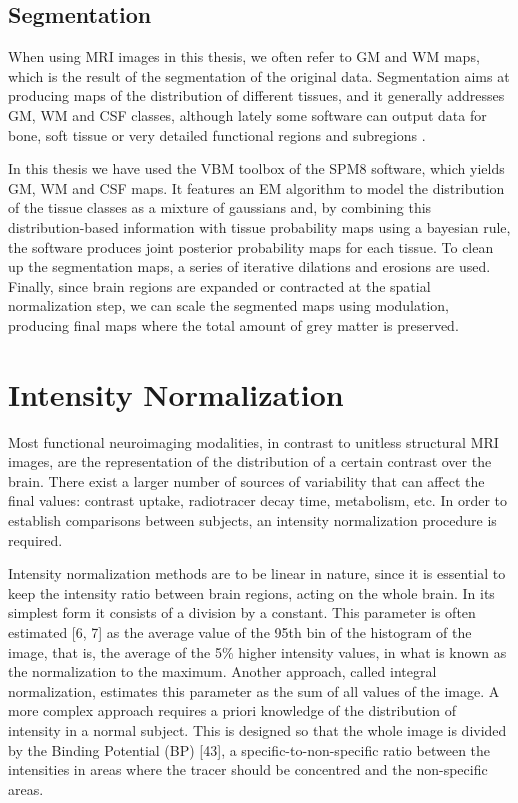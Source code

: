 \subsection{Segmentation}
When using \ac{MRI} images in this thesis, we often refer to \acf{GM} and \acf{WM} maps, which is the result of the segmentation of the original data. Segmentation aims at producing maps of the distribution of different tissues, and it generally addresses \ac{GM}, \ac{WM} and \ac{CSF} classes, although lately some software can output data for bone, soft tissue or very detailed functional regions and subregions \cite{Fischl2002}. 

In this thesis we have used the \ac{VBM} toolbox of the \ac{SPM8} software, which yields \ac{GM}, \ac{WM} and \ac{CSF} maps. It features an \ac{EM} algorithm to model the distribution of the tissue classes as a mixture of gaussians and, by combining this distribution-based information with tissue probability maps using a bayesian rule, the software produces joint posterior probability maps for each tissue. To clean up the segmentation maps, a series of iterative dilations and erosions are used. Finally, since brain regions are expanded or contracted at the spatial normalization step, we can scale the segmented maps using modulation, producing final maps where the total amount of grey matter is preserved. 

\section{Intensity Normalization}
Most functional neuroimaging modalities, in contrast to unitless structural MRI images, are the representation of the distribution of a certain contrast over the brain. There exist a larger number of sources of variability that can affect the final values: contrast uptake, radiotracer decay time, metabolism, etc.  In order to establish comparisons between subjects, an intensity normalization procedure is required. 

Intensity normalization methods are to be linear in nature, since it is essential to keep the intensity ratio between brain regions, acting on the whole brain. In its simplest form it consists of a division by a constant. This parameter is often estimated [6, 7] as the average value of the 95th bin of the histogram of the image, that is, the average of the 5\% higher intensity values, in what is known as the normalization to the maximum. Another approach, called integral normalization, estimates this parameter as the sum of all values of the image. A more complex approach requires a priori knowledge of the distribution of intensity in a normal subject. This is designed so that the whole image is divided by the Binding Potential (BP) [43], a specific-to-non-specific ratio between the intensities in areas where the tracer should be concentred and the non-specific areas. 

